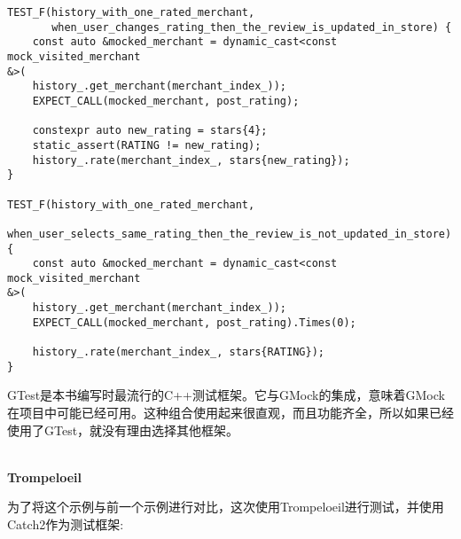 \begin{lstlisting}[style=styleCXX]
TEST_F(history_with_one_rated_merchant,
	   when_user_changes_rating_then_the_review_is_updated_in_store) {
	const auto &mocked_merchant = dynamic_cast<const mock_visited_merchant
&>(
	history_.get_merchant(merchant_index_));
	EXPECT_CALL(mocked_merchant, post_rating);
	
	constexpr auto new_rating = stars{4};
	static_assert(RATING != new_rating);
	history_.rate(merchant_index_, stars{new_rating});
}

TEST_F(history_with_one_rated_merchant,
	   when_user_selects_same_rating_then_the_review_is_not_updated_in_store) {
	const auto &mocked_merchant = dynamic_cast<const mock_visited_merchant
&>(
	history_.get_merchant(merchant_index_));
	EXPECT_CALL(mocked_merchant, post_rating).Times(0);
	
	history_.rate(merchant_index_, stars{RATING});
}
\end{lstlisting}

GTest是本书编写时最流行的C++测试框架。它与GMock的集成，意味着GMock在项目中可能已经可用。这种组合使用起来很直观，而且功能齐全，所以如果已经使用了GTest，就没有理由选择其他框架。

\hspace*{\fill} \\ %
\noindent
\textbf{Trompeloeil}

为了将这个示例与前一个示例进行对比，这次使用Trompeloeil进行测试，并使用Catch2作为测试框架:

